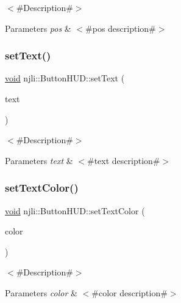 $<$\#\+Description\#$>$


\begin{DoxyParams}{Parameters}
{\em pos} & $<$\#pos description\#$>$ \\
\hline
\end{DoxyParams}
\mbox{\label{classnjli_1_1_button_h_u_d_a8346d046cb538f1c0269f1ce10354024}} 
\subsubsection{\texorpdfstring{set\+Text()}{setText()}}
{\footnotesize\ttfamily \mbox{\hyperlink{_thread_8h_af1e856da2e658414cb2456cb6f7ebc66}{void}} njli\+::\+Button\+H\+U\+D\+::set\+Text (\begin{DoxyParamCaption}\item[{const char $\ast$}]{text }\end{DoxyParamCaption})}

$<$\#\+Description\#$>$


\begin{DoxyParams}{Parameters}
{\em text} & $<$\#text description\#$>$ \\
\hline
\end{DoxyParams}
\mbox{\label{classnjli_1_1_button_h_u_d_a478e096b1d257953d612fabd1e2eaf62}} 
\subsubsection{\texorpdfstring{set\+Text\+Color()}{setTextColor()}}
{\footnotesize\ttfamily \mbox{\hyperlink{_thread_8h_af1e856da2e658414cb2456cb6f7ebc66}{void}} njli\+::\+Button\+H\+U\+D\+::set\+Text\+Color (\begin{DoxyParamCaption}\item[{const bt\+Vector4 \&}]{color }\end{DoxyParamCaption})}

$<$\#\+Description\#$>$


\begin{DoxyParams}{Parameters}
{\em color} & $<$\#color description\#$>$ \\
\hline
\end{DoxyParams}
\mbox{\label{classnjli_1_1_button_h_u_d_a8fededdc4f97b54d54568a6acfd43e4e}} 
